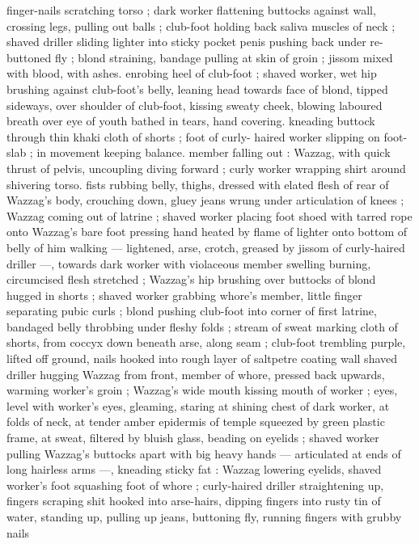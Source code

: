 finger-nails scratching torso ; dark worker flattening buttocks against 
wall, crossing legs, pulling out balls ; club-foot holding back saliva 
muscles of neck ; shaved driller sliding lighter into sticky pocket 
penis pushing back under re-buttoned fly ; blond straining, bandage 
pulling at skin of groin ; jissom mixed with blood, with ashes. 
enrobing heel of club-foot ; shaved worker, wet hip brushing against 
club-foot's belly, leaning head towards face of blond, tipped 
sideways, over shoulder of club-foot, kissing sweaty cheek, blowing 
laboured breath over eye of youth bathed in tears, hand covering. 
kneading buttock through thin khaki cloth of shorts ; foot of curly- 
haired worker slipping on foot-slab ; in movement keeping balance. 
member falling out : Wazzag, with quick thrust of pelvis, uncoupling 
diving forward ; curly worker wrapping shirt around shivering torso. 
fists rubbing belly, thighs, dressed with elated flesh of rear of 
Wazzag's body, crouching down, gluey jeans wrung under 
articulation of knees ; Wazzag coming out of latrine ; shaved worker 
placing foot shoed with tarred rope onto Wazzag's bare foot 
pressing hand heated by flame of lighter onto bottom of belly of him 
walking --- lightened, arse, crotch, greased by jissom of curly-haired 
driller ---, towards dark worker with violaceous member swelling 
burning, circumcised flesh stretched ; Wazzag's hip brushing over 
buttocks of blond hugged in shorts ; shaved worker grabbing 
whore's member, little finger separating pubic curls ; blond pushing 
club-foot into corner of first latrine, bandaged belly throbbing under 
fleshy folds ; stream of sweat marking cloth of shorts, from coccyx 
down beneath arse, along seam ; club-foot trembling purple, lifted 
off ground, nails hooked into rough layer of saltpetre coating wall 
shaved driller hugging Wazzag from front, member of whore, 
pressed back upwards, warming worker's groin ; Wazzag's wide 
mouth kissing mouth of worker ; eyes, level with worker's eyes, 
gleaming, staring at shining chest of dark worker, at folds of neck, at 
tender amber epidermis of temple squeezed by green plastic frame, 
at sweat, filtered by bluish glass, beading on eyelids ; shaved worker 
pulling Wazzag's buttocks apart with big heavy hands --- articulated 
at ends of long hairless arms ---, kneading sticky fat : Wazzag 
lowering eyelids, shaved worker's foot squashing foot of whore ; 
curly-haired driller straightening up, fingers scraping shit hooked 
into arse-hairs, dipping fingers into rusty tin of water, standing up, 
pulling up jeans, buttoning fly, running fingers with grubby nails 
